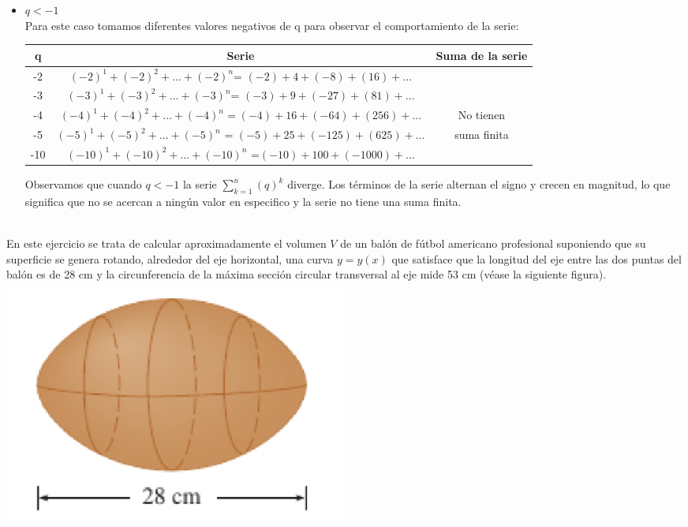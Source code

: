 \documentclass[12pt]{article}
\begin{document}
\begin{enumerate}
\begin{itemize}
    \item $q<-1$
\\
Para este caso tomamos diferentes valores negativos de q para observar el comportamiento de la serie:
   \begin{table} [H]
    \centering   
\begin{tabular}{| c | c | c |}
\hline
q &     Serie & Suma de la serie  \\ \hline
-2 &  $(-2)^1 + (-2)^2 +\ldots+(-2)^n$= $(-2) +4 + (-8) +(16)+ ...$ & \\ 
 -3 &  $(-3)^1 + (-3)^2 +\ldots+(-3)^n$=    $(-3) +9 + (-27) +(81)+ ...$ &\\ 
 -4& $(-4)^1 + (-4)^2 +\ldots+(-4)^n =(-4) +16 + (-64) +(256)+ ...$  &  No tienen     \\
 -5 & $(-5)^1 + (-5)^2 +\ldots+(-5)^n$ = $(-5) +25 + (-125) +(625)+ ...$ &  suma finita   \\ 
-10 &$(-10)^1 + (-10)^2 +\ldots+(-10)^n$ =$(-10) +100 + (-1000)+ ...$  &    \\ \hline
\end{tabular}

\label{tab:datos}

\end{table}
Observamos que cuando $q<-1$ la serie $\sum_{k=1}^{n} (q)^k $ diverge. Los términos de la serie alternan el signo y crecen en magnitud, lo que significa que no se acercan a ningún valor en especifico y la serie no tiene una suma finita.
    
\end{itemize}
\end{enumerate}


 \\


 En este ejercicio se trata de calcular aproximadamente el volumen \( V \) de un balón de fútbol americano profesional suponiendo que su superficie se genera rotando, alrededor del eje horizontal, una curva \( y = y(x) \) que satisface que la longitud del eje entre las dos puntas del balón es de 28 cm y la circunferencia de la máxima sección circular transversal al eje mide 53 cm (véase la siguiente figura).\\
    \includegraphics[width=0.5\textwidth, center]{balon.png}
\end{document}

